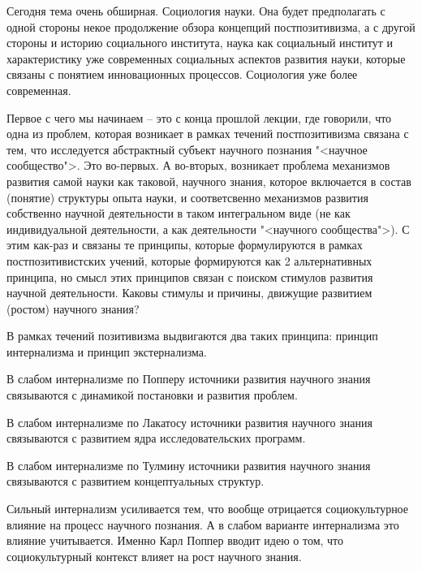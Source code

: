 \documentclass[main.tex]{subfiles}
\begin{document}


Сегодня тема очень обширная.
Социология науки.
Она будет предполагать с одной стороны некое продолжение обзора концепций постпозитивизма, а с другой стороны и историю социального института, наука как социальный институт и характеристику уже современных социальных аспектов развития науки, которые связаны с понятием инновационных процессов.
Социология уже более современная.



Первое с чего мы начинаем -- это с конца прошлой лекции, где говорили, что одна из проблем, которая возникает в рамках течений постпозитивизма связана с тем, что исследуется абстрактный субъект научного познания "<научное сообщество">.
Это во-первых.
А во-вторых, возникает проблема механизмов развития самой науки как таковой, научного знания, которое включается в состав (понятие) структуры опыта науки, и соответсвенно механизмов развития собственно научной деятельности в таком интегральном виде (не как индивидуальной деятельности, а как деятельности "<научного сообщества">).
С этим как-раз и связаны те принципы, которые формулируются в рамках постпозитивистских учений, которые формируются как 2 альтернативных принципа, но смысл этих принципов связан с поиском стимулов развития научной деятельности.
Каковы стимулы и причины, движущие развитием (ростом) научного знания?

В рамках течений позитивизма выдвигаются два таких принципа: принцип интернализма и принцип экстернализма.

В слабом интернализме по Попперу источники развития научного знания связываются с динамикой постановки и развития проблем.

В слабом интернализме по Лакатосу источники развития научного знания связываются с развитием ядра исследовательских программ.

В слабом интернализме по Тулмину источники развития научного знания связываются с развитием концептуальных структур.

Сильный интернализм усиливается тем, что вообще отрицается социокультурное влияние на процесс научного познания.
А в слабом варианте интернализма это влияние учитывается.
Именно Карл Поппер вводит идею о том, что социокультурный контекст влияет на рост научного знания.
\end{document}
